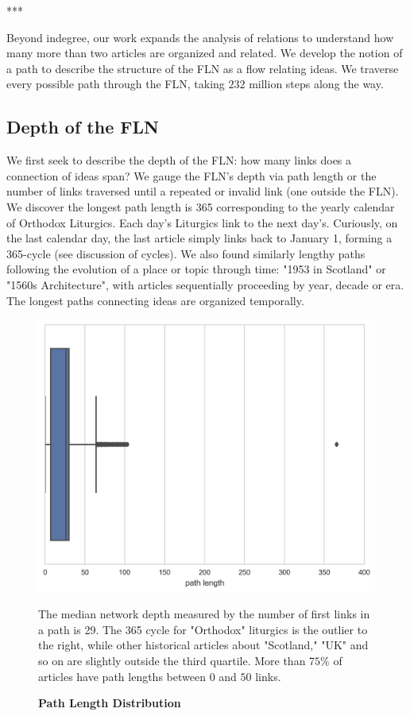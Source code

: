 \documentclass[pre,twocolumn,twoside,superscriptaddress,floatfix, aps, 10pt]{revtex4-1}
\begin{document}
\centerline{***}

Beyond indegree, our work expands the analysis of relations to understand 
how many more than two articles are organized and related. 
We develop the notion of a path to describe the structure of the FLN as a 
flow relating ideas. We traverse every possible path through the FLN, taking 
$232$ million steps along the way.


\subsection{Depth of the FLN}

We first seek to describe the depth of the FLN: how many links does a 
connection of ideas span? We gauge the FLN's depth via path length or the number of links traversed until a repeated or invalid link (one outside the FLN). 
We discover the longest path length is 365
corresponding to the yearly calendar of Orthodox Liturgics.
Each day's Liturgics link to the next day's. Curiously, on the last calendar day, the last article simply links back to January 1, forming a 365-cycle 
(see discussion of cycles).
We also found similarly lengthy paths following the evolution of a place or topic through time: 
"1953 in Scotland" or "1560s Architecture", with articles sequentially proceeding by year, decade or era.
The longest paths connecting ideas are organized temporally.

\begin{figure}[tp!]
  \centering	
  \includegraphics[width=\columnwidth]{graphics/path_lengths_boxplot.png}
  \caption{
    \textbf{Path Length Distribution}
  }
  The median network depth measured by the number of first links in a path
  is 29. The 365 cycle for "Orthodox" liturgics is the outlier to the right, while
  other historical articles about "Scotland," "UK" and so on are slightly outside
  the third quartile. More than $75\%$ of articles have path lengths between 
  $0$ and $50$ links.

  \label{fig:Path Length Distribution}
\end{figure}
\end{document}
